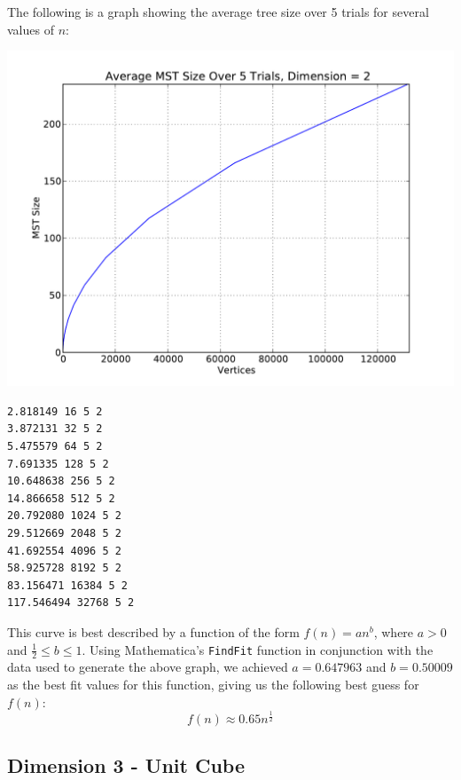 \documentclass[solution, letterpaper]{cs121}
\begin{document}
The following is a graph showing the average tree size over 5 trials for several values of $n$:
\begin{center}
\includegraphics[scale=0.8]{graphs/kruskals-dimension-2.pdf}
\begin{verbatim}
2.818149 16 5 2
3.872131 32 5 2
5.475579 64 5 2
7.691335 128 5 2
10.648638 256 5 2
14.866658 512 5 2
20.792080 1024 5 2
29.512669 2048 5 2
41.692554 4096 5 2
58.925728 8192 5 2
83.156471 16384 5 2
117.546494 32768 5 2
\end{verbatim}
\end{center}

This curve is best described by a function of the form $f(n)=an^b$, where $a > 0$ and $\frac{1}{2} \leq b \leq 1$. Using Mathematica's {\tt FindFit} function in conjunction with the data used to generate the above graph, we achieved $a=0.647963$ and $b=0.50009$ as the best fit values for this function, giving us the following best guess for $f(n)$:
\[f(n) \approx 0.65 n^{\frac{1}{2}}\]

\pagebreak
\subsection*{Dimension 3 - Unit Cube}
\end{document}
